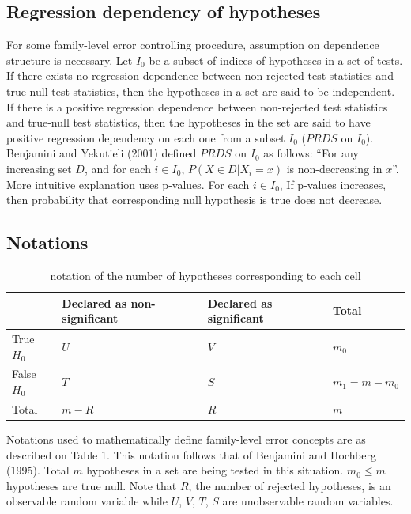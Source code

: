 \documentclass[a4paper, 11pt, oneside]{article}
\begin{document}
\subsection{Regression dependency of hypotheses}
For some family-level error controlling procedure, assumption on dependence structure is necessary. Let $I_0$ be a subset of indices of hypotheses in a set of tests. If there exists no regression dependence between non-rejected test statistics and true-null test statistics, then the hypotheses in a set are said to be independent. If there is a positive regression dependence between non-rejected test statistics and true-null test statistics, then the hypotheses in the set are said to have positive regression dependency on each one from a subset $I_0$ ($PRDS$ on $I_0$). Benjamini and Yekutieli (2001) defined $PRDS$ on $I_0$ as follows: \enquote{For any increasing set $D$, and for each $i \in I_0$, $P(X \in D | X_i = x)$ is non-decreasing in $x$}. More intuitive explanation uses p-values. For each $i \in I_0$, If p-values increases, then probability that corresponding null hypothesis is true does not decrease.

\subsection{Notations}
\begin{table}[ht]
    \small
    \setlength{\tabcolsep}{3pt}
\centering
\begin{tabularx}{.7\hsize}{@{}l LLL@{}}
    \toprule
 & Declared as non-significant  & Declared as significant & Total \\
    \midrule
True $H_0$ 
    & $U$ 
        & $V$ 
            & $m_0$ \\
False $H_0$ 
    & $T$ 
        & $S$
            &  $m_1=m-m_0$ \\
Total & $m-R$ 
        & $R$ 
            & $m$ \\
    \bottomrule
\end{tabularx}
\caption{notation of the number of hypotheses corresponding to each cell}
    \end{table}

Notations used to mathematically define family-level error concepts are as described on Table 1. This notation follows that of Benjamini and Hochberg (1995). Total $m$ hypotheses in a set are being tested in this situation. $m_0 \leq m$ hypotheses are true null. Note that $R$, the number of rejected hypotheses, is an observable random variable while $U$, $V$, $T$, $S$ are unobservable random variables.
\vspace{0.2in}
\end{document}

